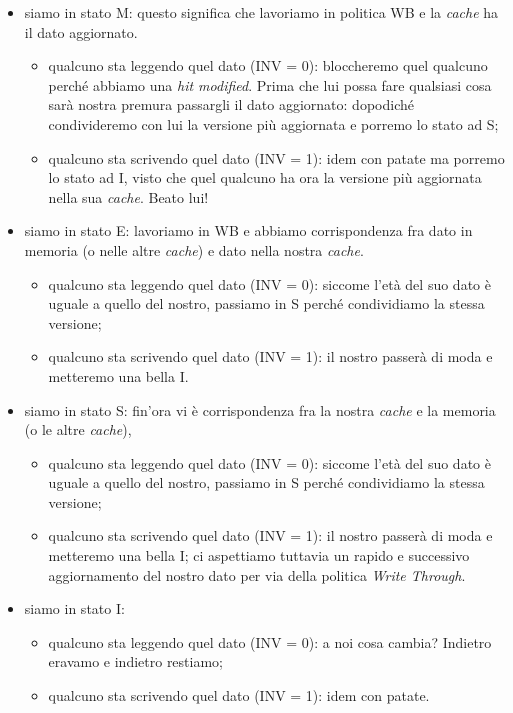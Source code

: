 \begin{itemize}
\item siamo in stato M: questo significa che lavoriamo in politica WB e la \textit{cache} ha il dato aggiornato. 
\begin{itemize}
\item qualcuno sta leggendo quel dato (INV = 0): bloccheremo quel qualcuno perché abbiamo una \textit{hit modified}. Prima che lui possa fare qualsiasi cosa sarà nostra premura passargli il dato aggiornato: dopodiché condivideremo con lui la versione più aggiornata e porremo lo stato ad S;
\item qualcuno sta scrivendo quel dato (INV = 1): idem con patate ma porremo lo stato ad I, visto che quel qualcuno ha ora la versione più aggiornata nella sua \textit{cache}. Beato lui! 
\end{itemize}
\item siamo in stato E: lavoriamo in WB e abbiamo corrispondenza fra dato in memoria (o nelle altre \textit{cache}) e dato nella nostra\textit{ cache}. 
\begin{itemize}
\item qualcuno sta leggendo quel dato (INV = 0): siccome l'età del suo dato è uguale a quello del nostro, passiamo in S perché condividiamo la stessa versione;
\item qualcuno sta scrivendo quel dato (INV = 1): il nostro passerà di moda e metteremo una bella I.
\end{itemize}
\item siamo in stato S: fin'ora vi è corrispondenza fra la nostra \textit{cache} e la memoria (o le altre \textit{cache}),
\begin{itemize}
\item qualcuno sta leggendo quel dato (INV = 0): siccome l'età del suo dato è uguale a quello del nostro, passiamo in S perché condividiamo la stessa versione;
\item qualcuno sta scrivendo quel dato (INV = 1): il nostro passerà di moda e metteremo una bella I; ci aspettiamo tuttavia un rapido e successivo aggiornamento del nostro dato per via della politica \textit{Write Through}.
\end{itemize} 
\item siamo in stato I: 
\begin{itemize}
\item qualcuno sta leggendo quel dato (INV = 0): a noi cosa cambia? Indietro eravamo e indietro restiamo;
\item qualcuno sta scrivendo quel dato (INV = 1): idem con patate.
\end{itemize}
\end{itemize}

